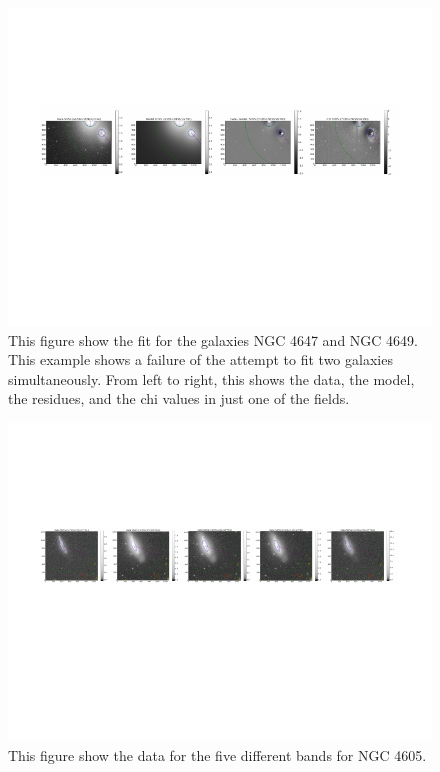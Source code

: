 \documentclass[12pt,preprint,pdftex]{aastex}
\begin{document}
\begin{figure}
\centering
\includegraphics[trim = .9cm 4.5cm 1.15cm 2.9cm,clip=true,width=\textwidth] {baddouble.pdf}
\caption{This figure show the fit for the galaxies NGC 4647 and NGC 4649. This example shows a failure of the attempt to fit two galaxies simultaneously. From left to right, this shows the data, the model, the residues, and the chi values in just one of the fields.}
\label{fig:baddouble}
\end{figure}
\begin{figure}
\centering
\includegraphics[trim = .9cm 4.5cm 0cm 2.9cm,clip=true,width=\textwidth] {goodsingle-colors-data.pdf}
\caption{This figure show the data for the five different bands for NGC 4605.}
\label{fig:colorsdata}
\end{figure}
\end{document}
